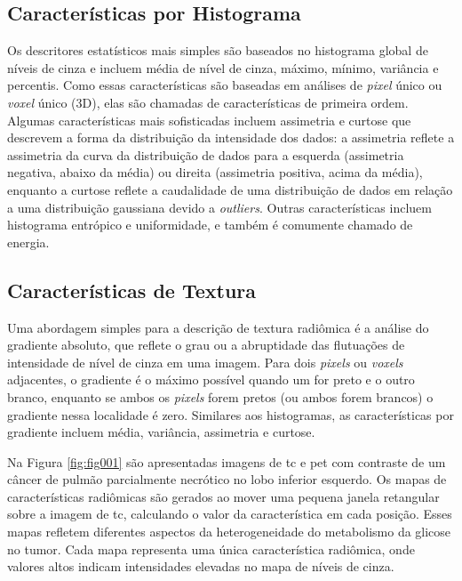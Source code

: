 \subsection{Características por Histograma}

Os descritores estatísticos mais simples são baseados no histograma global de níveis de cinza e incluem média de nível de cinza, máximo, mínimo, variância e percentis. Como essas características são baseadas em análises de \textit{pixel} único ou \textit{voxel} único (3D), elas são chamadas de características de primeira ordem. Algumas características mais sofisticadas incluem assimetria e curtose que descrevem a forma da distribuição da intensidade dos dados: a assimetria reflete a assimetria da curva da distribuição de dados para a esquerda (assimetria negativa, abaixo da média) ou direita (assimetria positiva, acima da média), enquanto a curtose reflete a caudalidade de uma distribuição de dados em relação a uma distribuição gaussiana devido a \textit{outliers}. Outras características incluem histograma entrópico e uniformidade, e também é comumente chamado de energia.

\subsection{Características de Textura}

Uma abordagem simples para a descrição de textura radiômica é a análise do gradiente absoluto, que reflete o grau ou a abruptidade das flutuações de intensidade de nível de cinza em uma imagem. Para dois \textit{pixels} ou \textit{voxels} adjacentes, o gradiente é o máximo possível quando um for preto e o outro branco, enquanto se ambos os \textit{pixels} forem pretos (ou ambos forem brancos) o gradiente nessa localidade é zero. Similares aos histogramas, as características por gradiente incluem média, variância, assimetria e curtose.

Na Figura \ref{fig:fig001} são apresentadas imagens de \gls{tc} e \gls{pet} com contraste de um câncer de pulmão parcialmente necrótico no lobo inferior esquerdo. Os mapas de características radiômicas são gerados ao mover uma pequena janela retangular sobre a imagem de \gls{tc}, calculando o valor da característica em cada posição. Esses mapas refletem diferentes aspectos da heterogeneidade do metabolismo da glicose no tumor. Cada mapa representa uma única característica radiômica, onde valores altos indicam intensidades elevadas no mapa de níveis de cinza.


